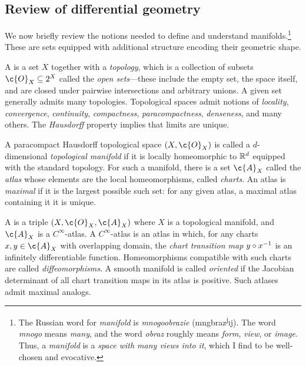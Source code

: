 \documentclass[11pt]{book}
\begin{document}
\subsection{Review of differential geometry}
We now briefly review the notions needed to define and understand manifolds.\footnote{The Russian word for \emph{manifold} is \emph{mnogoobrazie} (mngbr{\textquotesingle}az\textsuperscript{j}\textsc{i}j). The word \emph{mnogo} means \emph{many}, and the word \emph{obraz} roughly means \emph{form}, \emph{view}, or \emph{image}. 
Thus, a \emph{manifold} is a \emph{space with many views into it}, which I find to be well-chosen and evocative.}
These are sets equipped with additional structure encoding their geometric shape.

A  is a set $X$ together with a \emph{topology}, which is a collection of subsets $\c{O}_X \subseteq 2^X$ called the \emph{open sets}---these include the empty set, the space itself, and are closed under pairwise intersections and arbitrary unions.
A given set generally admits many topologies.
Topological spaces admit notions of \emph{locality}, \emph{convergence}, \emph{continuity}, \emph{compactness}, \emph{paracompactness}, \emph{denseness}, and many others.
The \emph{Hausdorff} property implies that limits are unique.

A paracompact Hausdorff topological space $(X,\c{O}_X)$ is called a $d$-dimensional \emph{topological manifold} if it is locally homeomorphic to $\mathbb{R}^d$ equipped with the standard topology.
For such a manifold, there is a set $\c{A}_X$ called the \emph{atlas} whose elements are the local homeomorphisms, called \emph{charts}.
An atlas is \emph{maximal} if it is the largest possible such set: for any given atlas, a maximal atlas containing it it is unique.

A  is a triple  $(X,\c{O}_X,\c{A}_X)$ where $X$ is a topological manifold, and $\c{A}_X$ is a $C^\infty$-atlas.
A $C^\infty$-atlas is an atlas in which, for any charts $x,y \in \c{A}_X$ with overlapping domain, the \emph{chart transition map} $y\circ x^{-1}$ is an infinitely differentiable function.
Homeomorphisms compatible with such charts are called \emph{diffeomorphisms}.
A smooth manifold is called \emph{oriented} if the Jacobian determinant of all chart transition maps in its atlas is positive.
Such atlases admit maximal analogs.
\end{document}
